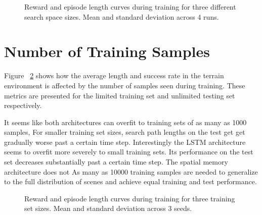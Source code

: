 \begin{figure}
    \centering
    
    
    
    \label{fig:shape}
    \caption[Search space size learning curve.]{Reward and episode length curves during training for three different search space sizes. Mean and standard deviation across 4 runs.}
\end{figure}

\section{Number of Training Samples}

Figure ~\ref{fig:sample} shows how the average length and success rate in the terrain environment is affected by the number of samples seen during training.
These metrics are presented for the limited training set and unlimited testing set respectively.

It seems like both architectures can overfit to training sets of as many as 1000 samples,
For smaller training set sizes, search path lengths on the test get get gradually worse past a certain time step.
Interestingly the LSTM architecture seems to overfit more severely to small training sets.
Its performance on the test set decreases substantially past a certain time step.
The spatial memory architecture does not 
As many as 10000 training samples are needed to generalize to the full distribution of scenes and achieve equal training and test performance. 

\begin{figure}
    \centering
    
    
    
    
    \label{fig:sample}
    \caption[Generalization results.]{Reward and episode length curves during training for three training set sizes. Mean and standard deviation across 3 seeds.}
\end{figure}

